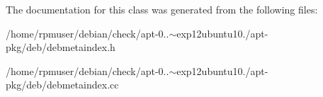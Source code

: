 \-The documentation for this class was generated from the following files\-:\begin{DoxyCompactItemize}
\item 
/home/rpmuser/debian/check/apt-\/0..$\sim$exp12ubuntu10./apt-\/pkg/deb/debmetaindex.\-h\item 
/home/rpmuser/debian/check/apt-\/0..$\sim$exp12ubuntu10./apt-\/pkg/deb/debmetaindex.\-cc\end{DoxyCompactItemize}
